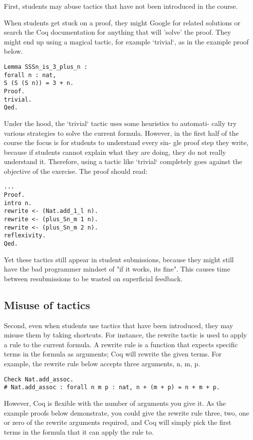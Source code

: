First, students may abuse tactics that have not been introduced in the course.

When students get stuck on a proof, they might Google for related solutions or search the Coq documentation for anything that will ’solve’ the proof. They might end up using a magical tactic, for example ‘trivial‘, as in the example proof below.

\begin{lstlisting}
Lemma SSSn_is_3_plus_n :
forall n : nat,
S (S (S n)) = 3 + n.
Proof.
trivial.
Qed.
\end{lstlisting}

Under the hood, the ‘trivial‘ tactic uses some heuristics to automati- cally try various strategies to solve the current formula. However, in the first half of the course the focus is for students to understand every sin- gle proof step they write, because if students cannot explain what they are doing, they do not really understand it. Therefore, using a tactic like ‘trivial‘ completely goes against the objective of the exercise. The proof should read:

\begin{lstlisting}
...
Proof.
intro n.
rewrite <- (Nat.add_1_l n).
rewrite <- (plus_Sn_m 1 n).
rewrite <- (plus_Sn_m 2 n).
reflexivity.
Qed.
\end{lstlisting}

Yet these tactics still appear in student submissions, because they might still have the bad programmer mindset of "if it works, its fine". This causes time between resubmissions to be wasted on superficial feedback.

\subsection{Misuse of tactics}
Second, even when students use tactics that have been introduced, they may misuse them by taking shortcuts. For instance, the rewrite tactic is used to apply a rule to the current formula. A rewrite rule is a function that expects specific terms in the formula as arguments; Coq will rewrite the given terms. For example, the rewrite rule below accepts three arguments, n, m, p.

\begin{lstlisting}
Check Nat.add_assoc.
# Nat.add_assoc : forall n m p : nat, n + (m + p) = n + m + p.
\end{lstlisting}

However, Coq is flexible with the number of arguments you give it. As the example proofs below demonstrate, you could give the rewrite rule three, two, one or zero of the rewrite arguments required, and Coq will simply pick the first terms in the formula that it can apply the rule to.

